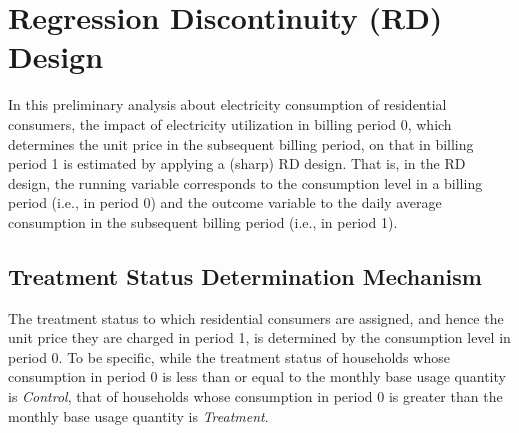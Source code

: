 









\author{Jinmahn Jo}

\date{September 27, 2020}





\tableofcontents
\vspace{1.0cm}
\listoftables
\vspace{0.5cm}
\listoffigures
\clearpage



\section{Regression Discontinuity (RD) Design}
In this preliminary analysis about electricity consumption of residential consumers, the impact of electricity utilization in billing period 0, which determines the unit price in the subsequent billing period, on that in billing period 1 is estimated by applying a (sharp) RD design. That is, in the RD design, the running variable corresponds to the consumption level in a billing period (i.e., in period 0) and the outcome variable to the daily average consumption in the subsequent billing period (i.e., in period 1).

\subsection{Treatment Status Determination Mechanism}
The treatment status to which residential consumers are assigned, and hence the unit price they are charged in period 1, is determined by the consumption level in period 0. To be specific, while the treatment status of households whose consumption in period 0 is less than or equal to the monthly base usage quantity is \textit{Control}, that of households whose consumption in period 0 is greater than the monthly base usage quantity is \textit{Treatment}.

